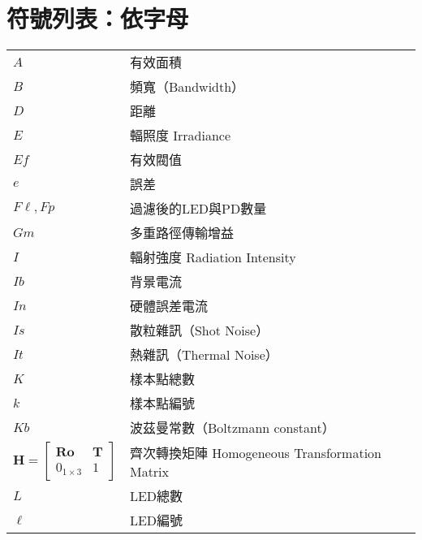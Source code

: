 \chapter*{符號列表：依字母}
\label{chp:symbol_alphabet}




\begin{longtable}[l]{ll}
    $A$ & 有效面積\\
    $B$& 頻寬（Bandwidth）\\

    $D$&距離\\

    $E$ & 輻照度 Irradiance\\
    $Ef$&有效閥值\\
    $e$&誤差\\
    $F\ell,Fp$ & 過濾後的LED與PD數量\\
    $Gm$&多重路徑傳輸增益\\

    $I$ & 輻射強度 Radiation Intensity\\
    $Ib$&背景電流\\
    $In$&硬體誤差電流\\
    $Is$&散粒雜訊（Shot Noise）\\
    $It$&熱雜訊（Thermal Noise）\\

    $K$&樣本點總數\\
    $k$&樣本點編號\\
    $Kb$&波茲曼常數（Boltzmann constant）\\

    $\boldsymbol{H}=\left[\begin{array}{cc}
        \boldsymbol{Ro}  & \boldsymbol{T} \\
        0_{1\times3} & 1
        \end{array}\right]$ & 齊次轉換矩陣 Homogeneous Transformation Matrix\\
        
    $L$ & LED總數\\
    $\ell$ & LED編號\\


\end{longtable}
